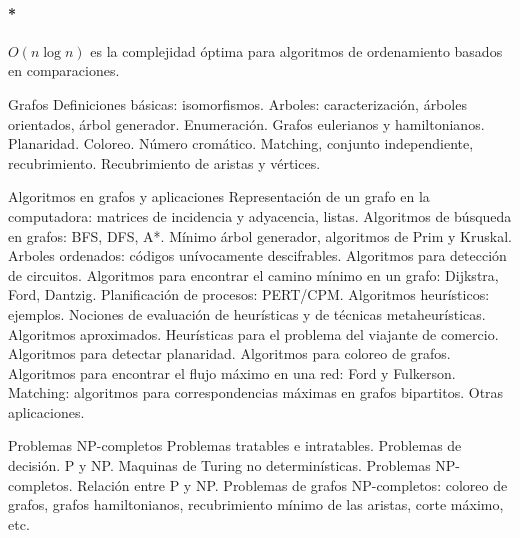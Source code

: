 \paragraph{*} \(O(n\log{n})\) es la complejidad óptima para algoritmos de ordenamiento basados en comparaciones. 

\color{red}

Grafos Definiciones básicas: isomorfismos. Arboles: caracterización, árboles orientados, árbol generador. Enumeración. Grafos eulerianos y hamiltonianos. Planaridad. Coloreo. Número cromático. Matching, conjunto independiente, recubrimiento. Recubrimiento de aristas y vértices.



Algoritmos en grafos y aplicaciones Representación de un grafo en la computadora: matrices de incidencia y adyacencia, listas. Algoritmos de búsqueda en grafos: BFS, DFS, A*. Mínimo árbol generador, algoritmos de Prim y Kruskal. Arboles ordenados: códigos unívocamente descifrables. Algoritmos para detección de circuitos. Algoritmos para encontrar el camino mínimo en un grafo: Dijkstra, Ford, Dantzig. Planificación de procesos: PERT/CPM. Algoritmos heurísticos: ejemplos. Nociones de evaluación de heurísticas y de técnicas metaheurísticas. Algoritmos aproximados. Heurísticas para el problema del viajante de comercio. Algoritmos para detectar planaridad. Algoritmos para coloreo de grafos. Algoritmos para encontrar el flujo máximo en una red: Ford y Fulkerson. Matching: algoritmos para correspondencias máximas en grafos bipartitos. Otras aplicaciones.



Problemas NP-completos Problemas tratables e intratables. Problemas de decisión. P y NP. Maquinas de Turing no determinísticas. Problemas NP-completos. Relación entre P y NP. Problemas de grafos NP-completos: coloreo de grafos, grafos hamiltonianos, recubrimiento mínimo de las aristas, corte máximo, etc.


